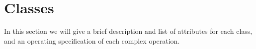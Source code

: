 \section{Classes}
In this section we will give a brief description and list of attributes for each class, and an operating specification of each complex operation.
\begin{comment}
 \paragraph{Person:}This class purpose is to register new users in the helpdesk. When a person register, he/she need to provide the Person class with following attributes:
\begin{itemize}
 \item{name}
 \item{mail}
 \item{username}
 \item{password}
\end{itemize}
 
\paragraph{Login:}\fixme{Hvad er det for en klasse?}After a user is registered in the helpdesk, he/she can login using their username and password they choose when registering. The login class purpose it to make sure all users is registered before they can submit problems and add comments. The login class need the following attributes: \fixme{Hvad er det for en klasse?}
\begin{itemize}
\item{username}
\item{password}
\end{itemize}
 
\paragraph{HelpdeskWindow:} \fixme{Hvad er det for en klasse?}All windows in the helpdesk inherits from this class. The HelpdeskWindow class is an abstact class, which purpose is to provide a standard layout for all windows. This class use the following attributes: \fixme{Hvad er det for en klasse?}
\begin{itemize}
\item{width}
\item{height}
\item{position}
\end{itemize}


\end{comment}
